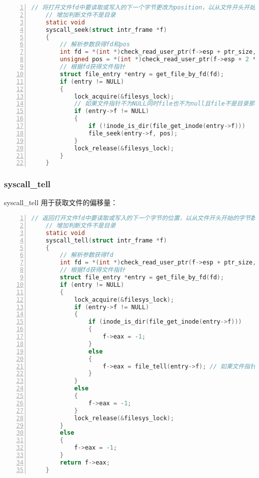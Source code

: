 \documentclass{article}
\begin{document}
	\begin{lstlisting}[xleftmargin = 4em,xrightmargin = 4em, aboveskip = 1em, numbers = left, language = C,title=src/userprog/syscall.c - syscall\_seek()]
    // 将打开文件fd中要读取或写入的下一个字节更改为position，以从文件开头开始的字节表示。（因此，position为0是文件的开始。）
    // 增加判断文件不是目录
    static void
    syscall_seek(struct intr_frame *f)
    {
        // 解析参数获得fd和pos
        int fd = *(int *)check_read_user_ptr(f->esp + ptr_size, sizeof(int));
        unsigned pos = *(int *)check_read_user_ptr(f->esp + 2 * ptr_size, sizeof(unsigned));
        // 根据fd获得文件指针
        struct file_entry *entry = get_file_by_fd(fd);
        if (entry != NULL)
        {
            lock_acquire(&filesys_lock);
            // 如果文件指针不为NULL同时file也不为null且file不是目录那么就将fd中要读取或者写入的下一个字节更改为position
            if (entry->f != NULL)
            {
                if (!inode_is_dir(file_get_inode(entry->f)))
                file_seek(entry->f, pos);
            }
            lock_release(&filesys_lock);
        }
    }
	\end{lstlisting}
	
	\subsubsection{syscall\_tell}
	
	syscall\_tell 用于获取文件的偏移量：
	
	\begin{lstlisting}[xleftmargin = 4em,xrightmargin = 4em, aboveskip = 1em, numbers = left, language = C,title=src/userprog/syscall.c - syscall\_tell()]
    // 返回打开文件fd中要读取或写入的下一个字节的位置，以从文件开头开始的字节数表示。
    // 增加判断文件不是目录
    static void
    syscall_tell(struct intr_frame *f)
    {
        // 解析参数获得fd
        int fd = *(int *)check_read_user_ptr(f->esp + ptr_size, sizeof(int));
        // 根据fd获得文件指针
        struct file_entry *entry = get_file_by_fd(fd);
        if (entry != NULL)
        {
            lock_acquire(&filesys_lock);
            if (entry->f != NULL)
            {
                if (inode_is_dir(file_get_inode(entry->f)))
                {
                    f->eax = -1;
                }
                else
                {
                    f->eax = file_tell(entry->f); // 如果文件指针不为NULL那么就返回要读取或写入的下一个字节的位置
                }
            }
            else
            {
                f->eax = -1;
            }
            lock_release(&filesys_lock);
        }
        else
        {
            f->eax = -1;
        }
        return f->eax;
    }
	\end{lstlisting}
	
\end{document}
